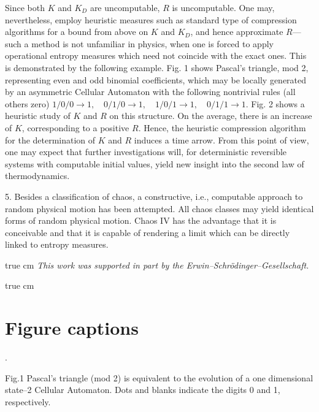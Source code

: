 Since both $K$ and $K_D$ are uncomputable, $R$ is uncomputable.
One may, nevertheless, employ heuristic measures such as standard type
of compression algorithms for a bound from above on $K$ and $K_D$, and
hence approximate $R$---such a method is not unfamiliar
in physics, when one is forced to
apply operational entropy measures which need not coincide with the
exact ones.
This is demonstrated by the following example.
Fig. 1 shows Pascal's triangle, mod 2, representing even and odd
binomial coefficients, which may be locally generated by
an asymmetric Cellular Automaton with the following nontrivial rules
(all others zero)
$1/0/0\rightarrow 1,\quad 0/1/0\rightarrow 1,\quad
  1/0/1\rightarrow 1,\quad 0/1/1\rightarrow 1$.
Fig. 2 shows a heuristic study of $K$ and $R$ on this structure.
On the average, there is an increase of $K$, corresponding to a positive
$R$.
Hence, the heuristic compression algorithm
for the determination of $K$ and $R$ induces
a time arrow.
From this point of view, one may expect that further
investigations will, for deterministic reversible systems with
computable
initial values, yield new insight into the second law of
thermodynamics.

5.
Besides a classification of chaos, a constructive, i.e., computable
approach to random physical motion has been attempted.
All chaos classes may yield identical forms of
random physical motion.  Chaos IV has
the advantage that it is conceivable and that it is capable of rendering
a limit which can be directly linked to entropy measures.

 true cm
{\it This work was supported in part by the
Erwin--Schr\"odinger--Gesellschaft.}


 true cm
\section*{Figure captions}
.

{\sc Fig.1} {Pascal's triangle (mod 2) is equivalent to the evolution
of
a one dimensional state--2 Cellular Automaton. Dots and blanks indicate
the digits 0 and 1, respectively.}

